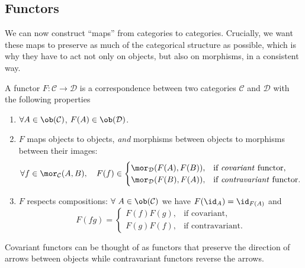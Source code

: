 \subsection{Functors}

We can now construct ``maps'' from categories to categories.
Crucially, we want these maps to preserve as much of the categorical
structure as possible, which is why they have to act not only on objects,
but also on morphisms, in a consistent way.
\begin{defn}[Functors]
A functor $F:\mathcal{C}\rightarrow\mathcal{D}$ is a correspondence
between two categories $\mathcal{C}$ and $\mathcal{D}$ with the
following properties 
\begin{enumerate}
\item $\forall A\in\ob(\mathcal{C})$, $F(A)\in\ob(\mathcal{D})$.
\item $F$ maps objects to objects, \emph{and} morphisms between objects to
morphisms between their images:
\begin{equation}
\forall f\in\mor_{\mathcal{C}}(A,B),\quad F(f)\in\begin{cases}
\mor_{\mathcal{D}}(F(A),F(B)), & \text{if \emph{covariant} functor},\\
\mor_{\mathcal{D}}(F(B),F(A)), & \text{if \emph{contravariant} functor}.
\end{cases}
\end{equation}
 
\item $F$ respects compositions: $\forall~A\in\ob(\mathcal{C})$ we have $F(\id_{A})=\id_{F(A)}$
and
\begin{equation}
F(fg)=\begin{cases}
F(f)F(g), & \text{if covariant},\\
F(g)F(f), & \text{if contravariant}.
\end{cases}
\end{equation}
\end{enumerate}
Covariant functors can be thought of as functors that preserve the direction
of arrows between objects while contravariant functors reverse the
arrows.
\end{defn}

